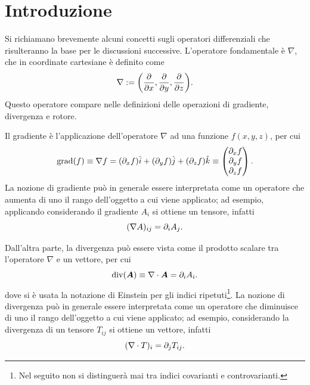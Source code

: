 \chapter{Introduzione}
Si richiamano brevemente alcuni concetti sugli operatori differenziali che risulteranno la base per le discussioni successive. L'operatore fondamentale è $\nabla$, che in coordinate cartesiane è definito come
\begin{equation}
    \nabla := \bigg(\frac{\partial}{\partial x},\frac{\partial}{\partial y},\frac{\partial}{\partial z}\bigg).
\end{equation}
Questo operatore compare nelle definizioni delle operazioni di gradiente, divergenza e rotore. 

Il gradiente è l'applicazione dell'operatore $\nabla$ ad una funzione $f(x,y,z)$, per cui 
\begin{equation}
    \mathrm{grad}(f) \equiv \nabla f = (\partial_xf)\hat{i} + (\partial_yf)\hat{j} + (\partial_zf)\hat{k} \equiv 
    \begin{pmatrix}
        \partial_xf \\
        \partial_yf \\
        \partial_zf
    \end{pmatrix}.
\end{equation}
La nozione di gradiente può in generale essere interpretata come un operatore che aumenta di uno il rango dell'oggetto a cui viene applicato; ad esempio, applicando considerando il gradiente $A_i$ si ottiene un tensore, infatti
\begin{equation}
    (\nabla A)_{ij} = \partial_iA_j.
\end{equation}

Dall'altra parte, la divergenza può essere vista come il prodotto scalare tra l'operatore $\nabla$ e un vettore, per cui 
\begin{equation}
    \mathrm{div}(\bm{A}) \equiv \nabla \cdot \bm{A} = \partial_iA_i.
\end{equation}
dove si è usata la notazione di Einstein per gli indici ripetuti\footnote{Nel seguito non si distinguerà mai tra indici covarianti e controvarianti.}. La nozione di divergenza può in generale essere interpretata come un operatore che diminuisce di uno il rango dell'oggetto a cui viene applicato; ad esempio, considerando la divergenza di un tensore $T_{ij}$ si ottiene un vettore, infatti
\begin{equation}
    (\nabla \cdot T)_i = \partial_jT_{ij}.
\end{equation}

